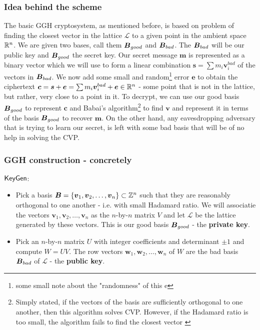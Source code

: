 \subsubsection*{Idea behind the scheme}
The basic GGH cryptosystem, as mentioned before, is based on problem of finding the closest vector in the lattice $\mathcal{L}$ to a given point in the ambient space $\mathbb{R}^n$. We are given two bases, call them $\boldsymbol{B}_{good}$ and $\boldsymbol{B}_{bad}$. The $\boldsymbol{B}_{bad}$ will be our public key and $\boldsymbol{B}_{good}$ the secret key. Our secret message $\bm{m}$ is represented as a binary vector which we will use to form a linear combination $\bm{s} = \sum m_i \bm{v}_i^{bad}$ of the vectors in $\boldsymbol{B}_{bad}$. We now add some small and random\footnote{some small note about the "randomness" of this e} error $\bm{e}$ to obtain the ciphertext $\boldsymbol{c} = \boldsymbol{s} + \boldsymbol{e} = \sum m_i \boldsymbol{v}_i^{bad} + \boldsymbol{e} \in \mathbb{R}^n$ - some point that is not in the lattice, but rather, very close to a point in it.
To decrypt, we can use our good basis $\boldsymbol{B}_{good}$ to represent $\bm{c}$ and Babai's algorithm\footnote{Simply stated, if the vectors of the basis are sufficiently orthogonal to one another, then this algorithm solves CVP. However, if the Hadamard ratio is too small, the algorithm fails to find the closest vector \cite{book}} to find $\bm{v}$ and represent it in terms of the basis $\boldsymbol{B}_{good}$  to recover $\bm{m}$. On the other hand, any eavesdropping adversary that is trying to learn our secret, is left with some bad basis that will be of no help in solving the CVP.

\subsubsection*{GGH construction - concretely}
$\alg{KeyGen}$:
\begin{itemize}
    \item Pick a basis $\boldsymbol{B} = \{\boldsymbol{v}_1, \boldsymbol{v}_2, \dots, \boldsymbol{v}_n\} \subset \mathbb{Z}^n$ such that they are reasonably orthogonal to one another - i.e. with small Hadamard ratio. We will associatie the vectors $\bm{v}_1, \bm{v}_2, \dots, \bm{v}_n$ as the $n$-by-$n$ matrix $V$ and let $\mathcal{L}$ be the lattice generated by these vectors. This is our good basis $\boldsymbol{B}_{good}$ - the \textbf{private key}.
    \item Pick an $n$-by-$n$ matrix $U$ with integer coefficients and determinant $\pm 1$ and compute $W = UV$. The row vectors $\bm{w}_1, \bm{w}_2, \dots, \bm{w}_n$ of $W$ are the bad basis $\boldsymbol{B}_{bad}$ of $\mathcal{L}$ - the \textbf{public key}.
\end{itemize}

